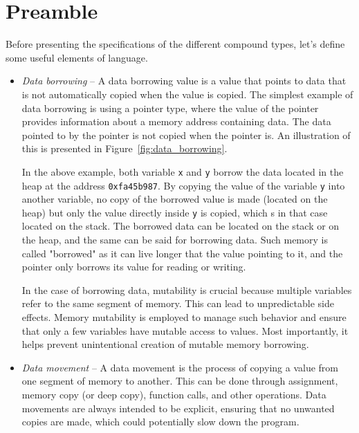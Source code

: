\section{Preamble}
\label{sec:preamble_compound_types}

Before presenting the specifications of the different compound types, let's
define some useful elements of language.

\begin{itemize}
\item \textit{Data borrowing} -- A data borrowing value is a value that points
  to data that is not automatically copied when the value is copied. The
  simplest example of data borrowing is using a pointer type, where the value of
  the pointer provides information about a memory address containing data. The
  data pointed to by the pointer is not copied when the pointer is. An
  illustration of this is presented in Figure~\ref{fig:data_borrowing}.

  

  In the above example, both variable \texttt{x} and \texttt{y} borrow the data
  located in the heap at the address \texttt{0xfa45b987}. By copying the value
  of the variable \texttt{y} into another variable, no copy of the borrowed
  value is made (located on the heap) but only the value directly inside
  \texttt{y} is copied, which s in that case located on the stack. The borrowed
  data can be located on the stack or on the heap, and the same can be said for
  borrowing data. Such memory is called "borrowed" as it can live longer that
  the value pointing to it, and the pointer only borrows its value for reading
  or writing.

  In the case of borrowing data, mutability is crucial because multiple
  variables refer to the same segment of memory. This can lead to unpredictable
  side effects. Memory mutability is employed to manage such behavior and ensure
  that only a few variables have mutable access to values. Most importantly, it
  helps prevent unintentional creation of mutable memory borrowing.

\item \textit{Data movement} -- A data movement is the process of copying a
  value from one segment of memory to another. This can be done through
  assignment, memory copy (or deep copy), function calls, and other operations.
  Data movements are always intended to be explicit, ensuring that no unwanted
  copies are made, which could potentially slow down the program.


\end{itemize}
